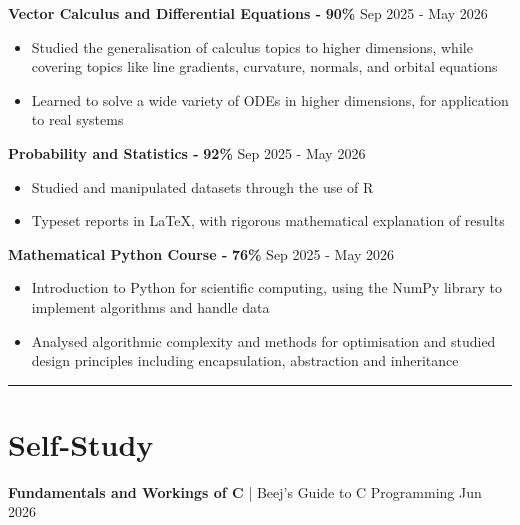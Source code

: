\documentclass[11pt, a4paper]{article}
\newcommand{\cvline}{\vspace{-4pt}\noindent\rule{\linewidth}{0.5pt}\vspace{-8pt}}
\begin{document}
\vspace{2pt}
{\large\textbf{Vector Calculus and Differential Equations -} \textbf{90\%} \hfill Sep 2025 - May 2026}
\vspace{2pt}

\begin{itemize}[leftmargin=*, itemsep=-3pt, topsep=2pt]
	\item Studied the generalisation of calculus topics to higher dimensions, while covering
		topics like line gradients, curvature, normals, and orbital equations
	\item Learned to solve a wide variety of ODEs in higher dimensions, for application
		to real systems
\end{itemize}


\vspace{2pt}
{\large\textbf{Probability and Statistics -} \textbf{92\%} \hfill Sep 2025 - May 2026}
\vspace{2pt}

\begin{itemize}[leftmargin=*, itemsep=-3pt, topsep=2pt]
	\item Studied and manipulated datasets through the use of R
	\item Typeset reports in LaTeX, with rigorous mathematical explanation of results
\end{itemize}


\vspace{2pt}
{\large\textbf{Mathematical Python Course - } \textbf{76\%} \hfill Sep 2025 - May 2026}
\vspace{2pt}

\begin{itemize}[leftmargin=*, itemsep=-3pt, topsep=2pt]
\item Introduction to Python for scientific computing, using the NumPy library to implement algorithms and 
	handle data
\item Analysed algorithmic complexity and methods for optimisation 
  and studied design principles including encapsulation, abstraction and inheritance
\end{itemize}



\cvline
\section{Self-Study}

\vspace{2pt}
{\large\textbf{Fundamentals and Workings of C} | Beej’s Guide to C Programming \hfill	Jun 2026}
\vspace{2pt}
\end{document}

